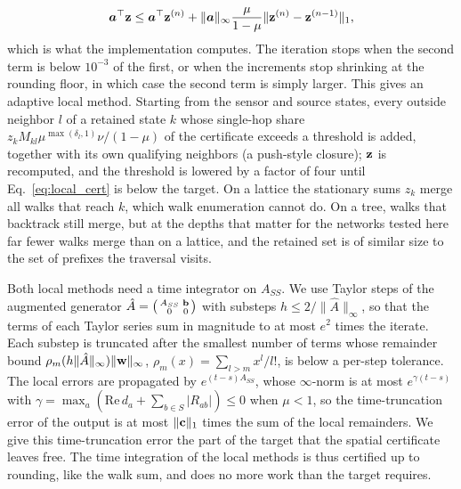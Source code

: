 \documentclass[aps,pra,superscriptaddress,floatfix,longbibliography,twocolumn]{revtex4-2}
\newcommand{\bb}{{\bf b}}
\newcommand{\bc}{{\bf c}}
\newcommand{\bz}{{\bf z}}
\newcommand{\bw}{{\bf w}}
\begin{document}
\begin{equation}\label{eq:local_cert_n}
\bm{a}^\top\bz\le\bm{a}^\top\bz^{(n)}+\|\bm{a}\|_\infty\frac{\mu}{1-\mu}\|\bz^{(n)}-\bz^{(n-1)}\|_1 ,
\end{equation}
which is what the implementation computes. The iteration stops when the second term is below $10^{-3}$ of the first, or when the increments stop shrinking at the rounding floor, in which case the second term is simply larger. This gives an adaptive local method. Starting from the sensor and source states, every outside neighbor $l$ of a retained state $k$ whose single-hop share $z_kM_{kl}\mu^{\max(\delta_l,1)}\nu/(1-\mu)$ of the certificate exceeds a threshold is added, together with its own qualifying neighbors (a push-style closure); $\bz$ is recomputed, and the threshold is lowered by a factor of four until Eq.~\eqref{eq:local_cert} is below the target. On a lattice the stationary sums $z_k$ merge all walks that reach $k$, which walk enumeration cannot do. On a tree, walks that backtrack still merge, but at the depths that matter for the networks tested here far fewer walks merge than on a lattice, and the retained set is of similar size to the set of prefixes the traversal visits.

Both local methods need a time integrator on $A_{SS}$. We use Taylor steps of the augmented generator $\hat A=\left(\begin{smallmatrix}A_{SS}&\bb\\0&0\end{smallmatrix}\right)$ with substeps $h\le2/\|\hat A\|_\infty$, so that the terms of each Taylor series sum in magnitude to at most $e^2$ times the iterate. Each substep is truncated after the smallest number of terms whose remainder bound $\rho_m(h\|\hat A\|_\infty)\|\bw\|_\infty$, $\rho_m(x)=\sum_{l>m}x^l/l!$, is below a per-step tolerance. The local errors are propagated by $e^{(t-s)A_{SS}}$, whose $\infty$-norm is at most $e^{\gamma(t-s)}$ with $\gamma=\max_a(\mathrm{Re}\,d_a+\sum_{b\in S}|R_{ab}|)\le0$ when $\mu<1$, so the time-truncation error of the output is at most $\|\bc\|_1$ times the sum of the local remainders. We give this time-truncation error the part of the target that the spatial certificate leaves free. The time integration of the local methods is thus certified up to rounding, like the walk sum, and does no more work than the target requires.
\end{document}
